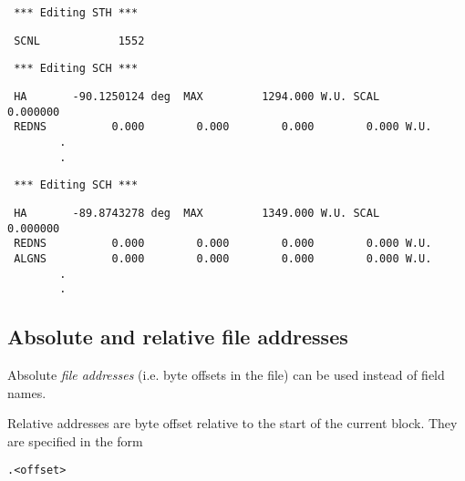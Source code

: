 \spbegin %
\svbegin \begin{verbatim} 
 *** Editing STH *** 
\end{verbatim}\svend 
%
%
\svbegin \begin{verbatim} 
 SCNL            1552
\end{verbatim} 
\svend 
\spend %
%
\spbegin %
%
\svbegin \begin{verbatim} 
 *** Editing SCH *** 
\end{verbatim} 
\svend 
\spend %
%
\spbegin %
\suser{*} 
%
\svbegin \begin{verbatim} 
 HA       -90.1250124 deg  MAX         1294.000 W.U. SCAL        0.000000 
 REDNS          0.000        0.000        0.000        0.000 W.U.
		.
		.

\end{verbatim} 
\svend 
\spend %
%
\spbegin %
%
\svbegin \begin{verbatim} 
 *** Editing SCH *** 
\end{verbatim}\svend 
%
\suser{*} 
%
\svbegin \begin{verbatim} 
 HA       -89.8743278 deg  MAX         1349.000 W.U. SCAL        0.000000 
 REDNS          0.000        0.000        0.000        0.000 W.U.
 ALGNS          0.000        0.000        0.000        0.000 W.U.
		.
		.

\end{verbatim} 
\svend 
\spend %



\subsection{ Absolute and relative file addresses} 
\label{.abs.rel.address} 

	Absolute {\em file addresses} (i.e.  byte offsets in the file) can be
used instead of field names. 

	Relative addresses are byte offset relative to the start of the current
block.  They are specified in the form 

	\verb/.<offset>/ 
